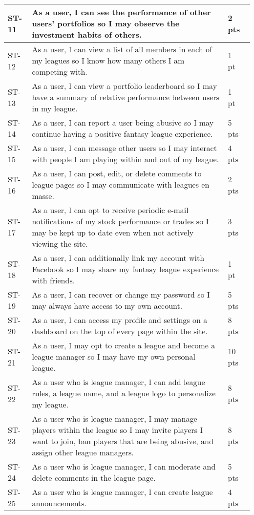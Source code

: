 \begin{longtable}{|p{0.6in}|p{4.6in}|p{0.5in}|}
ST-11&As a user, I can see the performance of other users' portfolios so I may observe the investment habits of others.&2 pts  \\ \hline 
ST-12&As a user, I can view a list of all members in each of my leagues so I know how many others I am competing with.&1 pt   \\ \hline 
ST-13&As a user, I can view a portfolio leaderboard so I may have a summary of relative performance between users in my league.&1 pt   \\ \hline 
ST-14&As a user, I can report a user being abusive so I may continue having a positive fantasy league experience.&5 pts  \\ \hline 
ST-15&As a user, I can message other users so I may interact with people I am playing within and out of my league.&4 pts  \\ \hline 
ST-16&As a user, I can post, edit, or delete comments to league pages so I may communicate with leagues en masse.&2 pts  \\ \hline 
ST-17&As a user, I can opt to receive periodic e-mail notifications of my stock performance or trades so I may be kept up to date even when not actively viewing the site.&3 pts  \\ \hline 
ST-18&As a user, I can additionally link my account with Facebook so I may share my fantasy league experience with friends.&1 pt   \\ \hline 
ST-19&As a user, I can recover or change my password so I may always have access to my own account.&5 pts  \\ \hline 
ST-20&As a user, I can access my profile and settings on a dashboard on the top of every page within the site.&8 pts  \\ \hline 
ST-21&As a user, I may opt to create a league and become a league manager so I may have my own personal league.&10 pts \\ \hline 
ST-22&As a user who is league manager, I can add league rules, a league name, and a league logo to personalize my league.&8 pts  \\ \hline 
ST-23&As a user who is league manager, I may manage players within the league so I may invite players I want to join, ban players that are being abusive, and assign other league managers.&8 pts  \\ \hline 
ST-24&As a user who is league manager, I can moderate and delete comments in the league page.&5 pts  \\ \hline 
ST-25&As a user who is league manager, I can create league announcements.&4 pts  \\ \hline 

\end{longtable}
